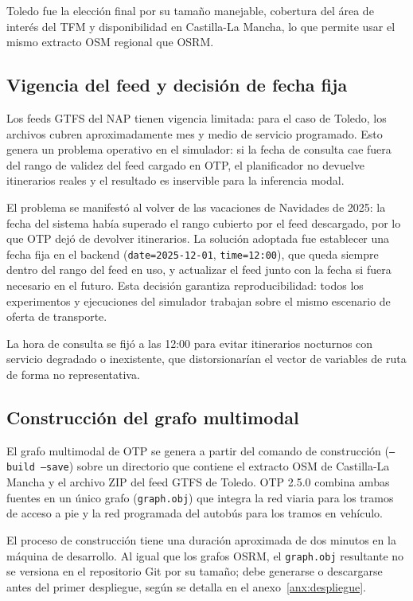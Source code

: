 Toledo fue la elección final por su tamaño manejable, cobertura del área de interés del TFM y disponibilidad en Castilla-La Mancha, lo que permite usar el mismo extracto OSM regional que OSRM.

\subsection{Vigencia del feed y decisión de fecha fija}

Los feeds GTFS del NAP tienen vigencia limitada: para el caso de Toledo, los archivos cubren aproximadamente mes y medio de servicio programado. Esto genera un problema operativo en el simulador: si la fecha de consulta cae fuera del rango de validez del feed cargado en OTP, el planificador no devuelve itinerarios reales y el resultado es inservible para la inferencia modal.

El problema se manifestó al volver de las vacaciones de Navidades de 2025: la fecha del sistema había superado el rango cubierto por el feed descargado, por lo que OTP dejó de devolver itinerarios. La solución adoptada fue establecer una fecha fija en el backend (\texttt{date=2025-12-01}, \texttt{time=12:00}), que queda siempre dentro del rango del feed en uso, y actualizar el feed junto con la fecha si fuera necesario en el futuro. Esta decisión garantiza reproducibilidad: todos los experimentos y ejecuciones del simulador trabajan sobre el mismo escenario de oferta de transporte.

La hora de consulta se fijó a las 12:00 para evitar itinerarios nocturnos con servicio degradado o inexistente, que distorsionarían el vector de variables de ruta de forma no representativa.

\subsection{Construcción del grafo multimodal}

El grafo multimodal de OTP se genera a partir del comando de construcción (\texttt{--build --save}) sobre un directorio que contiene el extracto OSM de Castilla-La Mancha y el archivo ZIP del feed GTFS de Toledo. OTP 2.5.0 combina ambas fuentes en un único grafo (\texttt{graph.obj}) que integra la red viaria para los tramos de acceso a pie y la red programada del autobús para los tramos en vehículo.

El proceso de construcción tiene una duración aproximada de dos minutos en la máquina de desarrollo. Al igual que los grafos OSRM, el \texttt{graph.obj} resultante no se versiona en el repositorio Git por su tamaño; debe generarse o descargarse antes del primer despliegue, según se detalla en el anexo~\ref{anx:despliegue}.

